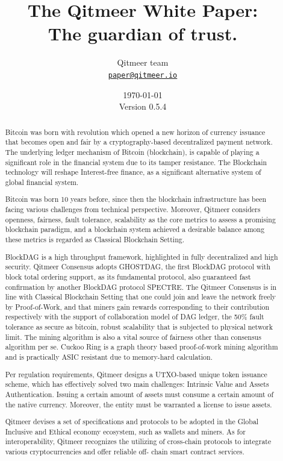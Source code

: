 \documentclass[a4paper,11pt]{article}
\title{\LARGE The Qitmeer White Paper:\\
	\Large The guardian of trust.}
\author{
	Qitmeer team\\
		\small\href{mailto:paper@qitmeer.io}
			{\nolinkurl{paper@qitmeer.io}}
	}
\date{\today\\\small Version 0.5.4}
\newcommand{\watermark}[3]{\AddToShipoutPictureBG{
	\parbox[b][\paperheight]{\paperwidth}{
		\vfill%
		\centering%
	\tikz[remember picture, overlay]%
	  \node [rotate = #1, scale = #2] at (current page.center)%
	      {\textcolor{gray!80!cyan!30}{#3}};
	  \vfill}}}
\begin{document}
\clearpage
\pagestyle{plain}

\maketitle


\begin{abstract}
Bitcoin\cite{bitcoin} was born with revolution which opened a new horizon of currency issuance that becomes open and fair by a cryptography-based decentralized payment network. The underlying ledger mechanism of Bitcoin (blockchain), is capable of playing a significant role in the financial system due to its tamper resistance. The Blockchain technology will reshape Interest-free finance, as a significant alternative system of global financial system.

 Bitcoin was born 10 years before, since then the blockchain infrastructure has been facing various challenges from technical perspective. Moreover, Qitmeer considers openness, fairness, fault tolerance, scalability as the core metrics to assess a promising blockchain paradigm, and a blockchain system achieved a desirable balance among these metrics is regarded as Classical Blockchain Setting.

BlockDAG is a high throughput framework, highlighted in fully decentralized and high security.
Qitmeer Consensus adopts GHOSTDAG, the first BlockDAG protocol with block total ordering support, as its fundamental protocol, also guaranteed fast confirmation by another BlockDAG protocol SPECTRE.
The Qitmeer Consensus is in line with Classical Blockchain Setting that one could join and leave the network freely by Proof-of-Work, and that miners gain rewards corresponding to their contribution respectively with the support of collaboration model of DAG ledger, the 50\% fault tolerance as secure as bitcoin, robust scalability that is subjected to physical network limit. The mining algorithm is also a vital source of fairness other than consensus algorithm per se. Cuckoo Ring is a graph theory based proof-of-work mining algorithm and is practically ASIC resistant due to memory-hard calculation. 

Per regulation requirements, Qitmeer designs a UTXO-based unique token issuance scheme, which has effectively solved two main challenges: Intrinsic Value and Assets Authentication. Issuing a certain amount of assets must consume a certain amount of the native currency. Moreover, the entity must be warranted a license to issue assets. 

Qitmeer devises a set of specifications and protocols to be adopted in the Global Inclusive and Ethical economy ecosystem, such as wallets and miners. As for interoperability, Qitmeer recognizes the utilizing of cross-chain protocols to integrate various cryptocurrencies and offer reliable off- chain smart contract services.

\end{abstract}
\end{document}
